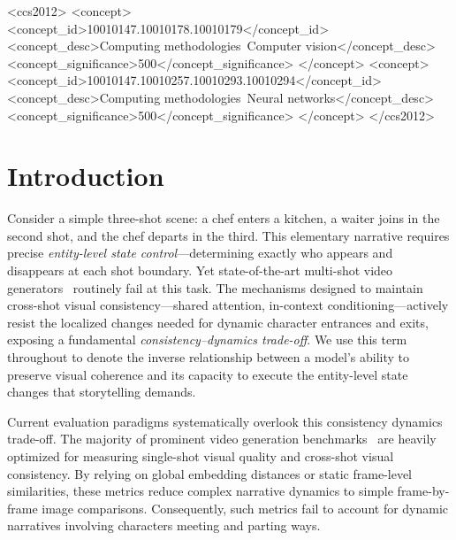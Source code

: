 \documentclass[sigconf,review,anonymous]{acmart}
\theoremstyle{definition}
\begin{document}
\begin{CCSXML}
<ccs2012>
  <concept>
    <concept_id>10010147.10010178.10010179</concept_id>
    <concept_desc>Computing methodologies~Computer vision</concept_desc>
    <concept_significance>500</concept_significance>
  </concept>
  <concept>
    <concept_id>10010147.10010257.10010293.10010294</concept_id>
    <concept_desc>Computing methodologies~Neural networks</concept_desc>
    <concept_significance>500</concept_significance>
  </concept>
</ccs2012>
\end{CCSXML}



\maketitle
\section{Introduction}
\label{sec:intro}

Consider a simple three-shot scene: a chef enters a kitchen, a waiter joins in the second shot, and the chef departs in the third. This elementary narrative requires precise \emph{entity-level state control}---determining exactly who appears and disappears at each shot boundary. Yet state-of-the-art multi-shot video generators~\cite{sora,storydiff,moviegen,ho2022video,svd,imagenvideo} routinely fail at this task. The mechanisms designed to maintain cross-shot visual consistency---shared attention, in-context conditioning---actively resist the localized changes needed for dynamic character entrances and exits, exposing a fundamental \emph{consistency--dynamics trade-off}. We use this term throughout to denote the inverse relationship between a model's ability to preserve visual coherence and its capacity to execute the entity-level state changes that storytelling demands.

Current evaluation paradigms systematically overlook this consistency dynamics trade-off. The majority of prominent video generation benchmarks~\cite{vbench,evalcrafter,t2vcompbench} are heavily optimized for measuring single-shot visual quality and cross-shot visual consistency. By relying on global embedding distances or static frame-level similarities, these metrics reduce complex narrative dynamics to simple frame-by-frame image comparisons. Consequently, such metrics fail to account for dynamic narratives involving characters meeting and parting ways.
\end{document}
